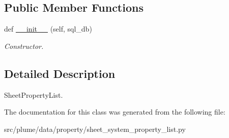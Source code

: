 \subsection*{Public Member Functions}
\begin{DoxyCompactItemize}
\item 
def \hyperlink{classplume-creator_1_1src_1_1plume_1_1data_1_1property_1_1sheet__system__property__list_1_1_sheet_system_property_list_a3ad0e00abff8efc88e6381bc36f9c654}{\+\_\+\+\_\+init\+\_\+\+\_\+} (self, sql\+\_\+db)\hypertarget{classplume-creator_1_1src_1_1plume_1_1data_1_1property_1_1sheet__system__property__list_1_1_sheet_system_property_list_a3ad0e00abff8efc88e6381bc36f9c654}{}\label{classplume-creator_1_1src_1_1plume_1_1data_1_1property_1_1sheet__system__property__list_1_1_sheet_system_property_list_a3ad0e00abff8efc88e6381bc36f9c654}

\begin{DoxyCompactList}\small\item\em Constructor. \end{DoxyCompactList}\end{DoxyCompactItemize}


\subsection{Detailed Description}
Sheet\+Property\+List. 

The documentation for this class was generated from the following file\+:\begin{DoxyCompactItemize}
\item 
src/plume/data/property/sheet\+\_\+system\+\_\+property\+\_\+list.\+py\end{DoxyCompactItemize}
